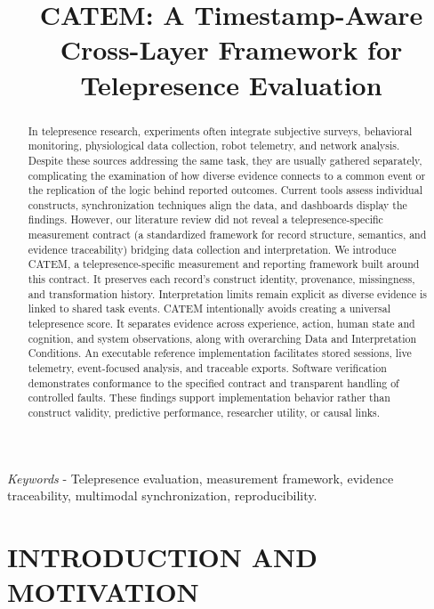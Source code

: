 \documentclass[letterpaper,10pt,conference]{ieeeconf}
\title{\LARGE \bf
CATEM: A Timestamp-Aware Cross-Layer Framework for Telepresence Evaluation
}
\author{\mbox{}}
\author{\mbox{}}
\begin{document}
\maketitle
\thispagestyle{empty}
\pagestyle{empty}

\begin{abstract}
In telepresence research, experiments often integrate subjective surveys, behavioral monitoring, physiological data collection, robot telemetry, and network analysis. Despite these sources addressing the same task, they are usually gathered separately, complicating the examination of how diverse evidence connects to a common event or the replication of the logic behind reported outcomes. Current tools assess individual constructs, synchronization techniques align the data, and dashboards display the findings. However, our literature review did not reveal a telepresence-specific measurement contract (a standardized framework for record structure, semantics, and evidence traceability) bridging data collection and interpretation. We introduce CATEM, a telepresence-specific measurement and reporting framework built around this contract. It preserves each record's construct identity, provenance, missingness, and transformation history. Interpretation limits remain explicit as diverse evidence is linked to shared task events. CATEM intentionally avoids creating a universal telepresence score. It separates evidence across experience, action, human state and cognition, and system observations, along with overarching Data and Interpretation Conditions. An executable reference implementation facilitates stored sessions, live telemetry, event-focused analysis, and traceable exports. Software verification demonstrates conformance to the specified contract and transparent handling of controlled faults. These findings support implementation behavior rather than construct validity, predictive performance, researcher utility, or causal links.
\end{abstract}

\noindent\textit{Keywords} - Telepresence evaluation, measurement framework, evidence traceability, multimodal synchronization, reproducibility.

\begingroup
\renewcommand\thefootnote{}
\addtocounter{footnote}{-1}
\endgroup

\section{INTRODUCTION AND MOTIVATION}
\end{document}
